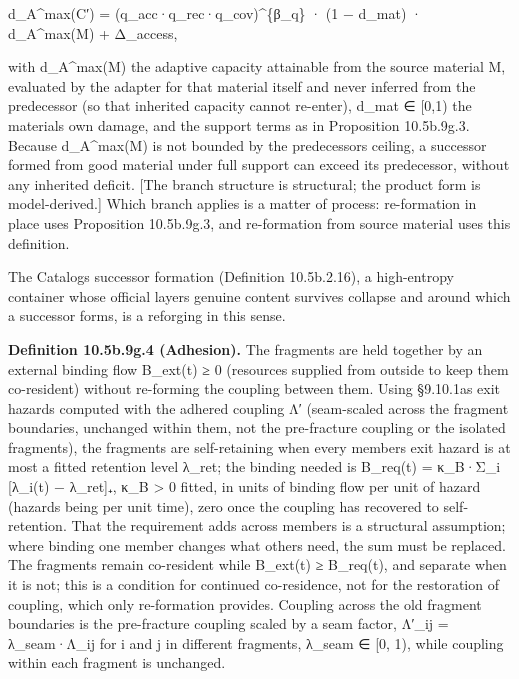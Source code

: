 \documentclass[
]{article}
\begin{document}
d\_A\^{}max(C′) = (q\_acc·q\_rec·q\_cov)\^{}\{β\_q\} · (1 − d\_mat) ·
d\_A\^{}max(M) + Δ\_access,

with d\_A\^{}max(M) the adaptive capacity attainable from the source
material M, evaluated by the adapter for that material itself and never
inferred from the predecessor (so that inherited capacity cannot
re-enter), d\_mat ∈ {[}0,1) the material\textquotesingle s own damage,
and the support terms as in Proposition 10.5b.9g.3. Because
d\_A\^{}max(M) is not bounded by the predecessor\textquotesingle s
ceiling, a successor formed from good material under full support can
exceed its predecessor, without any inherited deficit. {[}The branch
structure is structural; the product form is model-derived.{]} Which
branch applies is a matter of process: re-formation in place uses
Proposition 10.5b.9g.3, and re-formation from source material uses this
definition.

The Catalog\textquotesingle s successor formation (Definition
10.5b.2.16), a high-entropy container whose official
layer\textquotesingle s genuine content survives collapse and around
which a successor forms, is a reforging in this sense.

\textbf{Definition 10.5b.9g.4 (Adhesion).} The fragments are held
together by an external binding flow B\_ext(t) ≥ 0 (resources supplied
from outside to keep them co-resident) without re-forming the coupling
between them. Using §9.10.1a\textquotesingle s exit hazards computed
with the adhered coupling Λ′ (seam-scaled across the fragment
boundaries, unchanged within them, not the pre-fracture coupling or the
isolated fragments\textquotesingle), the fragments are self-retaining
when every member\textquotesingle s exit hazard is at most a fitted
retention level λ\_ret; the binding needed is B\_req(t) = κ\_B·Σ\_i
{[}λ\_i(t) − λ\_ret{]}₊, κ\_B \textgreater{} 0 fitted, in units of
binding flow per unit of hazard (hazards being per unit time), zero once
the coupling has recovered to self-retention. That the requirement adds
across members is a structural assumption; where binding one member
changes what others need, the sum must be replaced. The fragments remain
co-resident while B\_ext(t) ≥ B\_req(t), and separate when it is not;
this is a condition for continued co-residence, not for the restoration
of coupling, which only re-formation provides. Coupling across the old
fragment boundaries is the pre-fracture coupling scaled by a seam
factor, Λ′\_ij = λ\_seam·Λ\_ij for i and j in different fragments,
λ\_seam ∈ {[}0, 1), while coupling within each fragment is unchanged.
\end{document}
